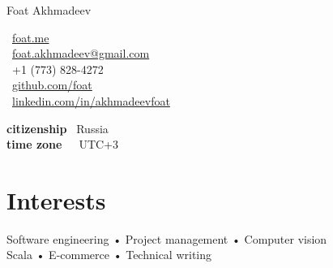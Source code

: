 \documentclass[10pt, a4paper]{article}
\makeatletter
\def\myauthor{Foat Akhmadeev}
\def\myphone{+1 (773) 828-4272}
\def\myemail{foat.akhmadeev@gmail.com}
\def\mygithub{github.com/foat}
\def\mylinkedin{linkedin.com/in/akhmadeevfoat}
\def\myhomesite{foat.me}
\def\mycitizenship{Russia}
\def\mytimezone{UTC+3}
\makeatother
\begin{document}
{\LARGE \myauthor}\\[1cm]
\begin{minipage}[t]{2in}
\end{minipage}
\begin{minipage}[t]{2in}
\flushleft
\faHome \, \href{http://\myhomesite}{\myhomesite}\\
\faEnvelopeAlt \, \href{mailto:\myemail}{\myemail}\\
\faPhone \, \myphone\\
\faGithub \, \href{https://\mygithub}{\mygithub}\\
\faLinkedin \, \href{https://\mylinkedin}{\mylinkedin}\\
\end{minipage}
\begin{minipage}[t]{3in}
\flushleft
\textbf{citizenship} \, \mycitizenship\\
\textbf{time zone}\, \, \, \mytimezone\\
\end{minipage}

\section*{Interests}
Software engineering • Project management • Computer vision \\
Scala • E-commerce • Technical writing
\end{document}
